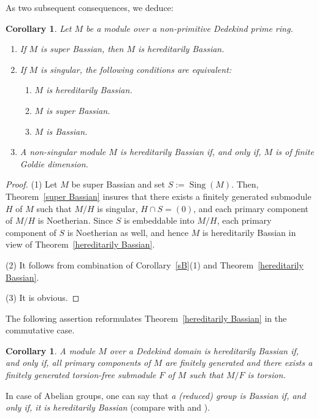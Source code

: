 \documentclass{amsart}
\newtheorem{cor}[thm]{Corollary}
\theoremstyle{definition}
\DeclareMathOperator{\Sing}{{Sing}}
\begin{document}
As two subsequent consequences, we deduce:

\begin{cor}\label{cor-Dedekind} Let $M$ be a module over a non-primitive Dedekind prime ring.
\begin{enumerate}
\item[(1)] If $M$ is super Bassian, then $M$ is hereditarily Bassian.
\item[(2)] If $M$ is singular, the following conditions are equivalent:
\begin{enumerate}
\item[(a)] $M$ is hereditarily Bassian.
\item[(b)] $M$ is super Bassian.
\item[(c)] $M$ is Bassian.
\end{enumerate}
 \item[(3)] A non-singular module $M$ is hereditarily Bassian if, and only if, $M$ is of finite Goldie dimension.
\end{enumerate}
\end{cor}

\begin{proof} (1) Let $M$ be super Bassian and set $S:=\Sing(M)$. Then, Theorem~\ref{super Bassian} insures that there exists a finitely generated submodule $H$ of $M$ such that $M/H$ is singular, $H\cap S=(0)$, and each primary component of $M/H$ is Noetherian. Since $S$ is embeddable into $M/H$, each primary component of $S$ is Noetherian as well, and hence $M$ is hereditarily Bassian in view of Theorem~\ref{hereditarily Bassian}.

(2) It follows from combination of Corollary~\ref{sB}(1) and Theorem~\ref{hereditarily Bassian}.

(3) It is obvious.
\end{proof}

The following assertion reformulates Theorem~\ref{hereditarily Bassian} in the commutative case.

\begin{cor} A module $M$ over a Dedekind domain is hereditarily Bassian if, and only if, all primary components of $M$ are finitely generated and there exists a finitely generated torsion-free submodule $F$ of $M$ such that $M/F$ is torsion.
\end{cor}

In case of Abelian groups, one can say that {\it a (reduced) group is Bassian if, and only if, it is hereditarily Bassian} (compare with \cite{DG} and \cite{K}).
\end{document}
